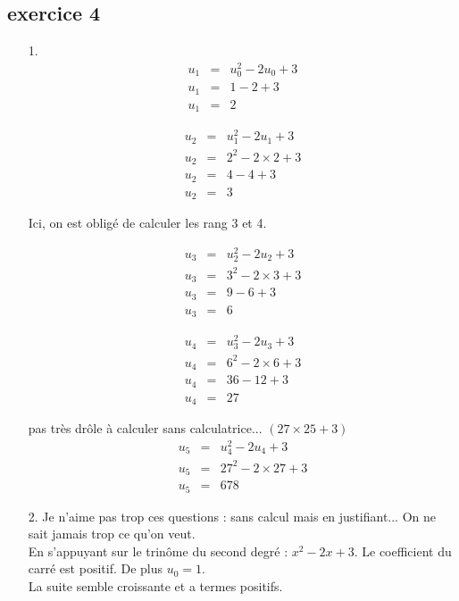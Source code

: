 \documentclass[11pt]{article}
\begin{document}
\begin{multicols}{2}
  \section{exercice 4}
  \begin{enumerate}
  \item[1.] 
    \begin{eqnarray*}
      u_1 &=& u_{0}^{2} - 2u_0 + 3 \\
      u_1 &=& 1 - 2 + 3 \\
      u_1 &=& 2
    \end{eqnarray*}
    
    \begin{eqnarray*}
      u_2 &=& u_{1}^{2} - 2u_1 + 3 \\
      u_2 &=& 2^2 - 2 \times 2 + 3 \\
      u_2 &=& 4 - 4 + 3 \\
      u_2 &=& 3
    \end{eqnarray*}
    
    Ici, on est obligé de calculer les rang 3 et 4.
    
    \begin{eqnarray*}
      u_3 &=& u_{2}^{2} - 2u_2 + 3 \\
      u_3 &=& 3^2 - 2 \times 3 + 3 \\
      u_3 &=& 9 - 6 + 3 \\
      u_3 &=& 6
    \end{eqnarray*}
    
    \begin{eqnarray*}
      u_4 &=& u_{3}^{2} - 2u_3 + 3 \\
      u_4 &=& 6^2 - 2 \times 6 + 3 \\
      u_4 &=& 36 - 12 + 3 \\
      u_4 &=& 27
    \end{eqnarray*}
    
    pas très drôle à calculer sans calculatrice... $(27 \times 25 + 3)$
    \begin{eqnarray*}
      u_5 &=& u_{4}^{2} - 2u_4 + 3 \\
      u_5 &=& 27^2 - 2 \times 27 + 3 \\
      u_5 &=& 678
    \end{eqnarray*}
    
  \item[2.] Je n'aime pas trop ces questions : sans calcul mais en justifiant... On ne sait jamais trop ce qu'on veut.\\
    En s'appuyant sur le trinôme du second degré : $x^2 -2x +3$. Le coefficient du carré est positif. De plus $u_0 = 1$.\\
    La suite semble croissante et a termes positifs.
    

\end{enumerate}
\end{multicols}
\end{document}
